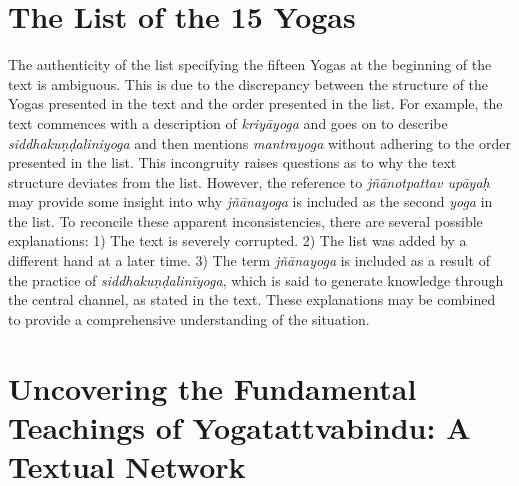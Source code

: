 \chapter{The List of the 15 Yogas}
\label{yogas_list}
The authenticity of the list specifying the fifteen Yogas at the beginning of the text is ambiguous. This is due to the discrepancy between the structure of the Yogas presented in the text and the order presented in the list. For example, the text commences with a description of \textit{kriyāyoga} and goes on to describe \textit{siddhakuṇḍaliniyoga} and then mentions \textit{mantrayoga} without adhering to the order presented in the list. This incongruity raises questions as to why the text structure deviates from the list. However, the reference to \textit{jñānotpattav upāyaḥ} may provide some insight into why \textit{jñānayoga} is included as the second \textit{yoga} in the list. To reconcile these apparent inconsistencies, there are several possible explanations: 1) The text is severely corrupted. 2) The list was added by a different hand at a later time. 3) The term \textit{jñānayoga} is included as a result of the practice of \textit{siddhakuṇḍalinīyoga}, which is said to generate knowledge through the central channel, as stated in the text. These explanations may be combined to provide a comprehensive understanding of the situation.



\chapter{Uncovering the Fundamental Teachings of Yogatattvabindu: A Textual Network}

